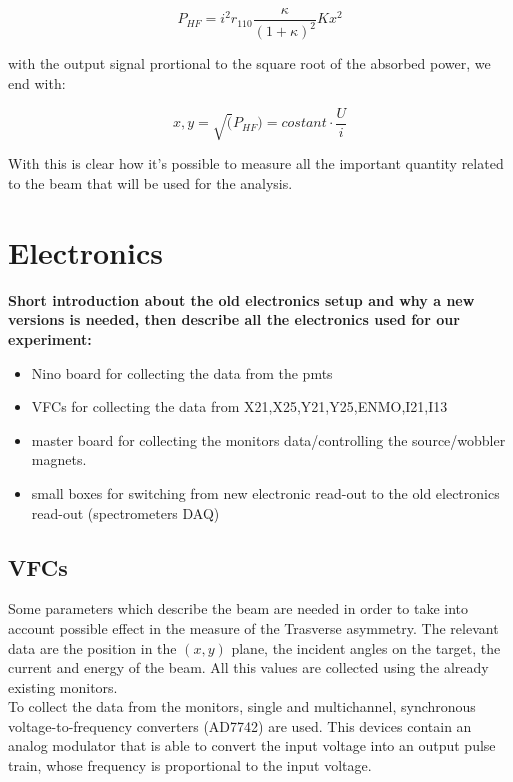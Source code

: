 \begin{equation}
P_{HF} = i^{2} r_{110} \frac{\kappa}{(1 + \kappa)^{2}} K x^{2}
\end{equation} 
 
with the output signal prortional to the square root of the absorbed power, we end with:

\begin{equation}
x,y = \sqrt(P_{HF}) = costant \cdot \frac{U}{i}  
\end{equation} 

With this is clear how it's possible to measure all the important quantity related to the beam that will be used for the analysis.

\section{Electronics}
{\bfseries Short introduction about the old electronics setup and why a new versions is needed, then describe all the electronics used for our experiment:}
\begin{itemize}
\item Nino board for collecting the data from the pmts
\item VFCs for collecting the data from X21,X25,Y21,Y25,ENMO,I21,I13
\item master board for collecting the monitors data/controlling the source/wobbler magnets.
\item small boxes for switching from new electronic read-out to the old electronics read-out (spectrometers DAQ)
\end{itemize}


\subsection{VFCs}

Some parameters which describe the beam are needed in order to take into account possible effect in the measure of the Trasverse asymmetry. The relevant data are the position in the $(x,y)$ plane, the incident angles on the target, the current and energy of the beam. All this values are collected using the already existing monitors. \\
To collect the data from the monitors, single and multichannel, synchronous voltage-to-frequency converters (AD7742) are used. This devices contain an analog modulator that is able to convert the input voltage into an output pulse train, whose frequency is proportional to the input voltage. 

